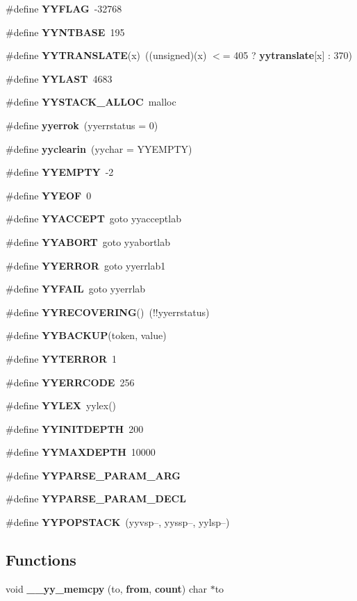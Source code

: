 \begin{CompactItemize}
\item 
\#define {\bf YYFLAG}\ -32768
\item 
\#define {\bf YYNTBASE}\ 195
\item 
\#define {\bf YYTRANSLATE}(x)\ ((unsigned)(x) $<$= 405 ? {\bf yytranslate}[x] : 370)
\item 
\#define {\bf YYLAST}\ 4683
\item 
\#define {\bf YYSTACK\_\-ALLOC}\ malloc
\item 
\#define {\bf yyerrok}\ (yyerrstatus = 0)
\item 
\#define {\bf yyclearin}\ (yychar = YYEMPTY)
\item 
\#define {\bf YYEMPTY}\ -2
\item 
\#define {\bf YYEOF}\ 0
\item 
\#define {\bf YYACCEPT}\ goto yyacceptlab
\item 
\#define {\bf YYABORT}\ goto yyabortlab
\item 
\#define {\bf YYERROR}\ goto yyerrlab1
\item 
\#define {\bf YYFAIL}\ goto yyerrlab
\item 
\#define {\bf YYRECOVERING}()\ (!!yyerrstatus)
\item 
\#define {\bf YYBACKUP}(token, value)
\item 
\#define {\bf YYTERROR}\ 1
\item 
\#define {\bf YYERRCODE}\ 256
\item 
\#define {\bf YYLEX}\ yylex()
\item 
\#define {\bf YYINITDEPTH}\ 200
\item 
\#define {\bf YYMAXDEPTH}\ 10000
\item 
\#define {\bf YYPARSE\_\-PARAM\_\-ARG}
\item 
\#define {\bf YYPARSE\_\-PARAM\_\-DECL}
\item 
\#define {\bf YYPOPSTACK}\ (yyvsp--, yyssp--, yylsp--)
\end{CompactItemize}
\subsection*{Functions}
\begin{CompactItemize}
\item 
void {\bf \_\-\_\-yy\_\-memcpy} (to, {\bf from}, {\bf count}) char $\ast$to
\end{CompactItemize}
